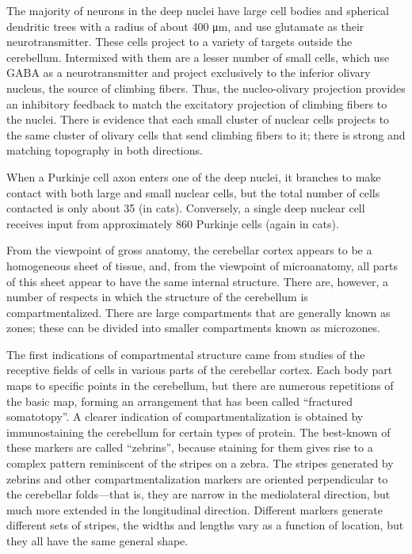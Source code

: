 The majority of neurons in the deep nuclei have large cell bodies and spherical dendritic trees with a radius of about 400 μm, and use glutamate as their neurotransmitter. These cells project to a variety of targets outside the cerebellum. Intermixed with them are a lesser number of small cells, which use GABA as a neurotransmitter and project exclusively to the inferior olivary nucleus, the source of climbing fibers. Thus, the nucleo-olivary projection provides an inhibitory feedback to match the excitatory projection of climbing fibers to the nuclei. There is evidence that each small cluster of nuclear cells projects to the same cluster of olivary cells that send climbing fibers to it; there is strong and matching topography in both directions.

When a Purkinje cell axon enters one of the deep nuclei, it branches to make contact with both large and small nuclear cells, but the total number of cells contacted is only about 35 (in cats). Conversely, a single deep nuclear cell receives input from approximately 860 Purkinje cells (again in cats).

From the viewpoint of gross anatomy, the cerebellar cortex appears to be a homogeneous sheet of tissue, and, from the viewpoint of microanatomy, all parts of this sheet appear to have the same internal structure. There are, however, a number of respects in which the structure of the cerebellum is compartmentalized. There are large compartments that are generally known as zones; these can be divided into smaller compartments known as microzones.

The first indications of compartmental structure came from studies of the receptive fields of cells in various parts of the cerebellar cortex. Each body part maps to specific points in the cerebellum, but there are numerous repetitions of the basic map, forming an arrangement that has been called ``fractured somatotopy''. A clearer indication of compartmentalization is obtained by immunostaining the cerebellum for certain types of protein. The best-known of these markers are called ``zebrins'', because staining for them gives rise to a complex pattern reminiscent of the stripes on a zebra. The stripes generated by zebrins and other compartmentalization markers are oriented perpendicular to the cerebellar folds---that is, they are narrow in the mediolateral direction, but much more extended in the longitudinal direction. Different markers generate different sets of stripes, the widths and lengths vary as a function of location, but they all have the same general shape.

